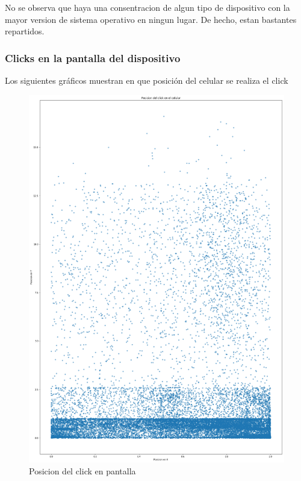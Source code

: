 \documentclass[a4paper, 12pt]{article}
\newcommand\tab[1][1cm]{\hspace*{#1}}
\begin{document}
		\tab No se observa que haya una consentracion de algun tipo de dispositivo con la mayor version de sistema operativo en ningun lugar. De hecho, estan bastantes repartidos.

	\subsubsection{Clicks en la pantalla del dispositivo}

		\tab Los siguientes gráficos muestran en que posición del celular se realiza el click

		\FloatBarrier
		\begin{figure}[h]
			\centering
			\includegraphics[scale=0.2]{images/clicks/clicks_touch_scatter.png}
			\caption{Posicion del click en pantalla}
		\end{figure}
		\FloatBarrier
\end{document}
